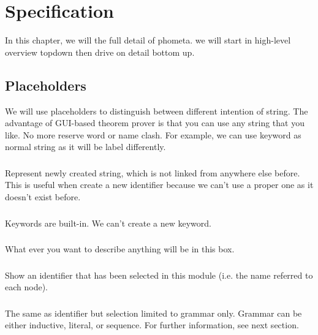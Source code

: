 \documentclass[master.tex]{subfiles}
\begin{document}
\chapter{Specification}
\label{chap:specification}

In this chapter, we will the full detail of phometa. we will start in high-level
overview topdown then drive on detail bottom up.

\section{Placeholders}

We will use placeholders to distinguish between different intention of string. The advantage of GUI-based theorem prover is that you can use any string that you like. No more reserve word or name clash. For example, we can use keyword as normal string as it will be label differently.

\subsection{} Represent newly created string, which is not linked from anywhere else before. This is useful when create a new identifier because we can't use a proper one as it doesn't exist before.

\subsection{} Keywords are built-in. We can't create a new keyword.

\subsection{} What ever you want to describe anything will be in this box.

\subsection{} Show an identifier that has been selected in this module (i.e. the name referred to each node).

\subsection{} The same as identifier but selection limited to grammar only. Grammar can be either inductive, literal, or sequence. For further information, see next section.
\end{document}
